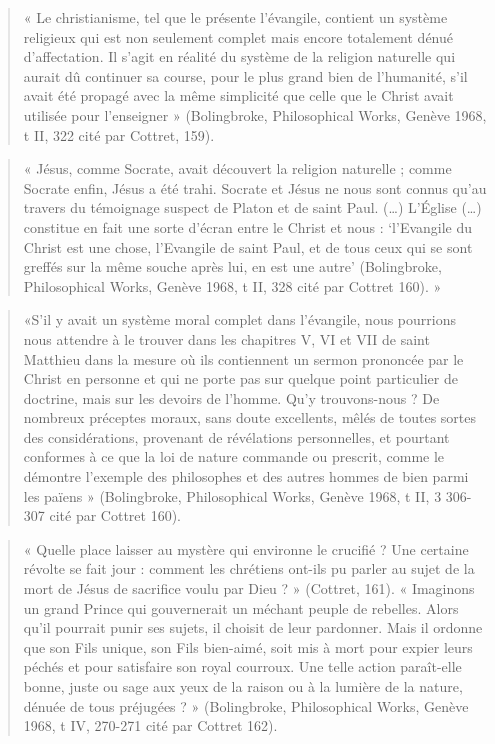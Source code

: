\begin{quote}
    « Le christianisme, tel que le présente l’évangile, contient un système religieux qui est non
seulement complet mais encore totalement dénué d’affectation. Il s’agit en réalité du système
de la religion naturelle qui aurait dû continuer sa course, pour le plus grand bien de
l’humanité, s’il avait été propagé avec la même simplicité que celle que le Christ avait utilisée
pour l’enseigner » (Bolingbroke, Philosophical Works, Genève 1968, t II, 322 cité par Cottret,
159).
\end{quote}

\begin{quote}
« Jésus, comme Socrate, avait découvert la religion naturelle ; comme Socrate enfin, Jésus a
été trahi. Socrate et Jésus ne nous sont connus qu’au travers du témoignage suspect de Platon
et de saint Paul. (…) L’Église (…) constitue en fait une sorte d’écran entre le Christ et nous :
‘l’Evangile du Christ est une chose, l’Evangile de saint Paul, et de tous ceux qui se sont
greffés sur la même souche après lui, en est une autre’ (Bolingbroke, Philosophical Works,
Genève 1968, t II, 328 cité par Cottret 160). »
    
\end{quote}


\begin{quote}
«S’il y avait un système moral complet dans l’évangile, nous pourrions nous attendre à le
trouver dans les chapitres V, VI et VII de saint Matthieu dans la mesure où ils contiennent un
sermon prononcée par le Christ en personne et qui ne porte pas sur quelque point particulier
de doctrine, mais sur les devoirs de l’homme. Qu’y trouvons-nous ? De nombreux préceptes
moraux, sans doute excellents, mêlés de toutes sortes des considérations, provenant de
révélations personnelles, et pourtant conformes à ce que la loi de nature commande ou
prescrit, comme le démontre l’exemple des philosophes et des autres hommes de bien parmi
les païens » (Bolingbroke, Philosophical Works, Genève 1968, t II, 3 306-307 cité par Cottret
160).
    
\end{quote}


\begin{quote}
« Quelle place laisser au mystère qui environne le crucifié ? Une certaine révolte se fait jour :
comment les chrétiens ont-ils pu parler au sujet de la mort de Jésus de sacrifice voulu par
Dieu ? » (Cottret, 161). « Imaginons un grand Prince qui gouvernerait un méchant peuple de
rebelles. Alors qu’il pourrait punir ses sujets, il choisit de leur pardonner. Mais il ordonne que
son Fils unique, son Fils bien-aimé, soit mis à mort pour expier leurs péchés et pour satisfaire
son royal courroux. Une telle action paraît-elle bonne, juste ou sage aux yeux de la raison ou à
la lumière de la nature, dénuée de tous préjugées ? » (Bolingbroke, Philosophical Works,
Genève 1968, t IV, 270-271 cité par Cottret 162).
    
\end{quote}


